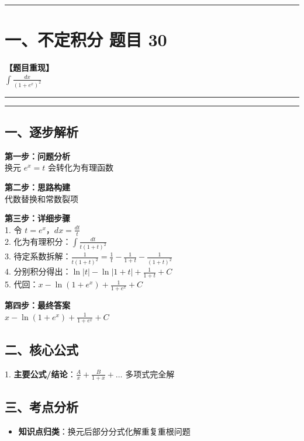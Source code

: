 ﻿\documentclass[12pt, a4paper]{ctexart}
\newcommand{\TopSeparator}{
    \par\noindent\rule{\textwidth}{1.5pt}\vspace{0.5em}
}
\newcommand{\AnalysisSeparator}{
    \par\noindent\rule{\textwidth}{0.5pt}\vspace{0.2em}\hrule\vspace{0.5em}
}
\newenvironment{RedAnalysis}{
    \par
    \color{red} 
}{
    \par
    \color{black} 
}
\begin{document}
\vspace{2em}

\TopSeparator
\section*{一、不定积分 题目 30}

\textbf{【题目重现】} \\
$\int \frac{dx}{(1+e^x)^2}$

\AnalysisSeparator

\begin{RedAnalysis}

	\subsection*{一、逐步解析}

	\textbf{第一步：问题分析} \\
	换元 $e^x=t$ 会转化为有理函数

	\textbf{第二步：思路构建} \\
	代数替换和常数裂项

	\textbf{第三步：详细步骤} \\
	1. 令 $t = e^x$，$dx = \frac{dt}{t}$ \\ 
	2. 化为有理积分：$\int \frac{dt}{t(1+t)^2}$ \\ 
	3. 待定系数拆解：$\frac{1}{t(1+t)^2} = \frac{1}{t} - \frac{1}{1+t} - \frac{1}{(1+t)^2}$ \\ 
	4. 分别积分得出：$\ln|t| - \ln|1+t| + \frac{1}{1+t} + C$ \\ 
	5. 代回：$x - \ln(1+e^x) + \frac{1}{1+e^x} + C$

	\textbf{第四步：最终答案} \\
	$x - \ln(1+e^x) + \frac{1}{1+e^x} + C$

	\subsection*{二、核心公式}
	1. \textbf{主要公式/结论}：$\frac{A}{x} + \frac{B}{1+x} + \dots \text{ 多项式完全解}$

	\subsection*{三、考点分析}
	\begin{itemize}
		\item \textbf{知识点归类}：换元后部分分式化解重复重根问题
	\end{itemize}

\end{RedAnalysis}
\end{document}

